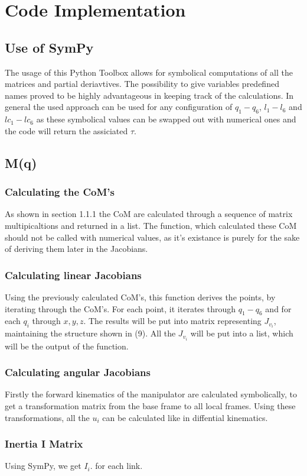 \documentclass{article}
\begin{document}
\section{Code Implementation}
\subsection{Use of SymPy}
The usage of this Python Toolbox allows for symbolical computations of all the matrices and partial deriavtives. The possibility to give variables predefined names proved to be highly advantageous in keeping track of the calculations. In general the used approach can be used for any configuration of $q_1-q_6$, $l_1-l_6$ and $lc_1-lc_6$ as these symbolical values can be swapped out with numerical ones and the code will return the assiciated $\tau$.
\subsection{M(q)}
\subsubsection{Calculating the CoM's}
As shown in section 1.1.1 the CoM are calculated through a sequence of matrix multipicaltions and returned in a list. The function, which calculated these CoM should not be called with numerical values, as it's existance is purely for the sake of deriving them later in the Jacobians.
\subsubsection{Calculating linear Jacobians}
Using the previously calculated CoM's, this function derives the points, by iterating through the CoM's. For each point, it iterates through $q_1-q_6$ and for each $q_i$ through $x,y,z$. The results will be put into matrix representing $J_{v_i}$, maintaining the structure shown in (9). All the $J_{v_i}$ will be put into a list, which will be the output of the function.
\subsubsection{Calculating angular Jacobians}
Firstly the forward kinematics of the manipulator are calculated symbolically, to get a transformation matrix from the base frame to all local frames. Using these transformations, all the $u_i$ can be calculated like in diffential kinematics.
\subsubsection{Inertia I Matrix}
Using SymPy, we get $I_i$. for each link.
\end{document}
